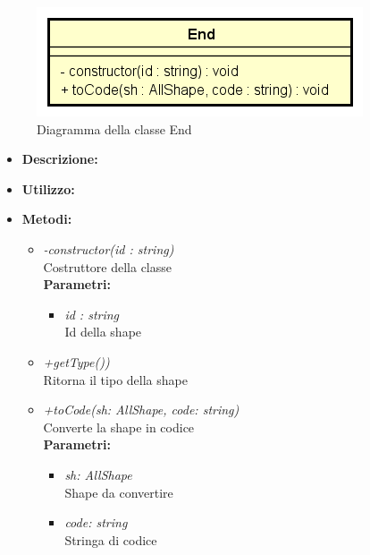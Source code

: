 \begin{figure}[h!]
	\centering
	\includegraphics[scale=0.8]{res/sections/SpecificaFrontEnd/Services/Disegnetti/end.png}
	\caption{Diagramma della classe End}
\end{figure}

\begin{itemize}
	\item \textbf{Descrizione:}\\
	
	\item \textbf{Utilizzo:}\\
	
	\item \textbf{Metodi:}
		\begin{itemize}
			\item \emph{-constructor(id : string)}\\
    		Costruttore della classe\\
    		\textbf{Parametri:}
    		\begin{itemize}
    			\item \emph{id : string}\\
    			Id della shape
    		\end{itemize}
			\item \emph{+getType())}\\
    		Ritorna il tipo della shape
			\item \emph{+toCode(sh: AllShape, code: string)}\\
    		Converte la shape in codice\\
    		\textbf{Parametri:}
    		\begin{itemize}
    			\item \emph{sh: AllShape}\\
    			Shape da convertire
    			\item \emph{code: string}\\
    			Stringa di codice
    		\end{itemize}
    	\end{itemize}
\end{itemize}